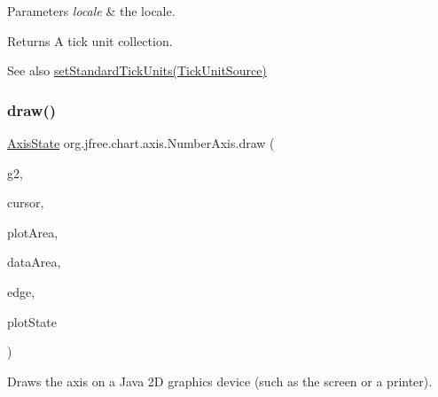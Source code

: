 \begin{DoxyParams}{Parameters}
{\em locale} & the locale.\\
\hline
\end{DoxyParams}
\begin{DoxyReturn}{Returns}
A tick unit collection.
\end{DoxyReturn}
\begin{DoxySeeAlso}{See also}
\mbox{\hyperlink{classorg_1_1jfree_1_1chart_1_1axis_1_1_value_axis_ac84e1ffa28cdea7b355306ae472d21a2}{set\+Standard\+Tick\+Units(\+Tick\+Unit\+Source)}} 
\end{DoxySeeAlso}
\mbox{\label{classorg_1_1jfree_1_1chart_1_1axis_1_1_number_axis_a2ed1acf2d3ad0a40af90b0ea341f6a46}} 
\subsubsection{\texorpdfstring{draw()}{draw()}}
{\footnotesize\ttfamily \mbox{\hyperlink{classorg_1_1jfree_1_1chart_1_1axis_1_1_axis_state}{Axis\+State}} org.\+jfree.\+chart.\+axis.\+Number\+Axis.\+draw (\begin{DoxyParamCaption}\item[{Graphics2D}]{g2,  }\item[{double}]{cursor,  }\item[{Rectangle2D}]{plot\+Area,  }\item[{Rectangle2D}]{data\+Area,  }\item[{Rectangle\+Edge}]{edge,  }\item[{\mbox{\hyperlink{classorg_1_1jfree_1_1chart_1_1plot_1_1_plot_rendering_info}{Plot\+Rendering\+Info}}}]{plot\+State }\end{DoxyParamCaption})}

Draws the axis on a Java 2D graphics device (such as the screen or a printer).


